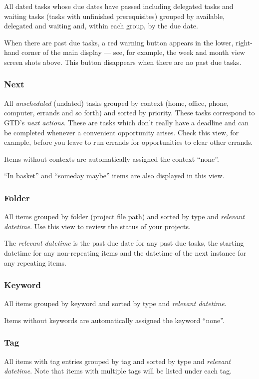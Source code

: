\documentclass[]{article}
\begin{document}
All dated tasks whose due dates have passed including delegated tasks
and waiting tasks (tasks with unfinished prerequisites) grouped by
available, delegated and waiting and, within each group, by the due
date.

When there are past due tasks, a red warning button appears in the
lower, right-hand corner of the main display --- see, for example, the
week and month view screen shots above. This button disappears when
there are no past due tasks.

\subsubsection{Next}

All \emph{unscheduled} (undated) tasks grouped by context (home, office,
phone, computer, errands and so forth) and sorted by priority. These
tasks correspond to GTD's \emph{next actions}. These are tasks which
don't really have a deadline and can be completed whenever a convenient
opportunity arises. Check this view, for example, before you leave to
run errands for opportunities to clear other errands.

Items without contexts are automatically assigned the context ``none''.

``In basket'' and ``someday maybe'' items are also displayed in this
view.

\subsubsection{Folder}

All items grouped by folder (project file path) and sorted by type and
\emph{relevant datetime}. Use this view to review the status of your
projects.

The \emph{relevant datetime} is the past due date for any past due
tasks, the starting datetime for any non-repeating items and the
datetime of the next instance for any repeating items.

\subsubsection{Keyword}

All items grouped by keyword and sorted by type and \emph{relevant
datetime}.

Items without keywords are automatically assigned the keyword ``none''.

\subsubsection{Tag}

All items with tag entries grouped by tag and sorted by type and
\emph{relevant datetime}. Note that items with multiple tags will be
listed under each tag.
\end{document}
